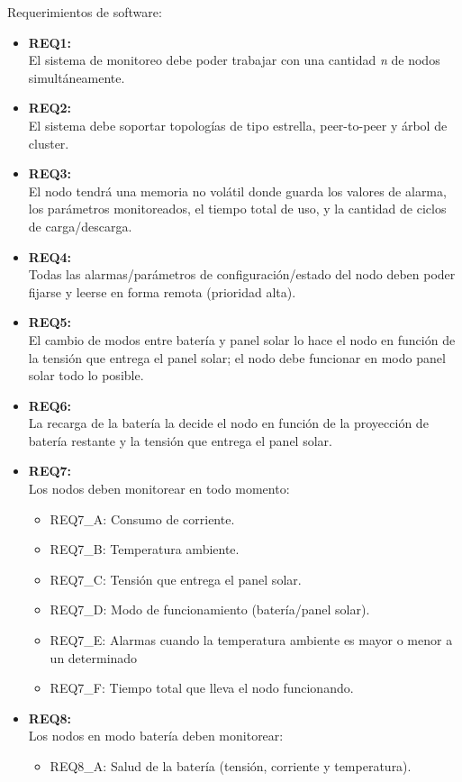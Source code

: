 \noindent Requerimientos de software:
\begin{itemize}
	\item \textbf{REQ1:}\\ El sistema de monitoreo debe poder trabajar con una cantidad \textit{n} de nodos simultáneamente.
	\item \textbf{REQ2:}\\ El sistema debe soportar topologías de tipo estrella, peer-to-peer y árbol de cluster.
	\item \textbf{REQ3:}\\ El nodo tendrá una memoria no volátil donde guarda los valores de alarma, los parámetros monitoreados, el tiempo total de uso, y la cantidad de ciclos de carga/descarga.
	\item \textbf{REQ4:}\\ Todas las alarmas/parámetros de configuración/estado del nodo deben poder fijarse y leerse en forma remota (prioridad alta).	
	\item \textbf{REQ5:}\\ El cambio de modos entre batería y panel solar lo hace el nodo en función de la tensión que entrega el panel solar; el nodo debe funcionar en modo panel solar todo lo posible.
	\item \textbf{REQ6:}\\ La recarga de la batería la decide el nodo en función de la proyección de batería restante y la tensión que entrega el panel solar.	
	\item \textbf{REQ7:}\\ Los nodos deben monitorear en todo momento:	
	\begin{itemize}
		\item REQ7\_A: Consumo de corriente.
		\item REQ7\_B: Temperatura ambiente.
		\item REQ7\_C: Tensión que entrega el panel solar.
		\item REQ7\_D: Modo de funcionamiento (batería/panel solar).
		\item REQ7\_E: Alarmas cuando la temperatura ambiente es mayor o menor a un determinado
		\item REQ7\_F: Tiempo total que lleva el nodo funcionando.
		\end{itemize}
	\item \textbf{REQ8:}\\Los nodos en modo batería deben monitorear:
		\begin{itemize}
		\item REQ8\_A: Salud de la batería (tensión, corriente y temperatura).

\end{itemize}
\end{itemize}
